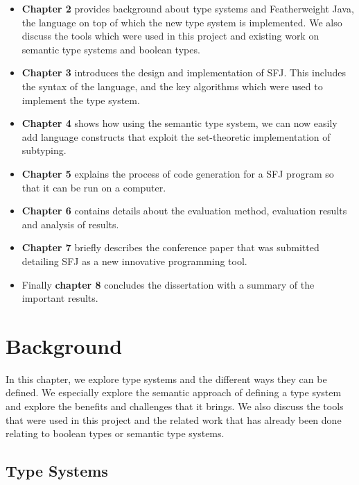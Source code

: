 \documentclass{l4proj}
\begin{document}
\begin{itemize}
    \item
          \textbf{Chapter 2} provides background about type systems and Featherweight Java, the language on top of which the new type system is implemented.
          We also discuss the tools which were used in this project and existing work on semantic type systems and boolean types.
    \item
          \textbf{Chapter 3} introduces the design and implementation of SFJ. This includes the syntax of the language, and the key algorithms which were used to implement the type system.
    \item
          \textbf{Chapter 4} shows how using the semantic type system, we can now easily add language constructs that exploit the set-theoretic implementation of subtyping.
    \item
          \textbf{Chapter 5} explains the process of code generation for a SFJ program so that it can be run on a computer.
    \item
          \textbf{Chapter 6} contains details about the evaluation method, evaluation results and analysis of results.
    \item
          \textbf{Chapter 7} briefly describes the conference paper that was submitted detailing SFJ as a new innovative programming tool.
    \item
          Finally \textbf{chapter 8} concludes the dissertation with a summary of the important results.
\end{itemize}


\chapter{Background}

In this chapter, we explore type systems and the different ways they can be defined.
We especially explore the semantic approach of defining a type system and explore the benefits and challenges that it brings.
We also discuss the tools that were used in this project and the related work that has already been done relating to boolean types or semantic type systems.

\section{Type Systems}
\label{sec:framework}
\end{document}
